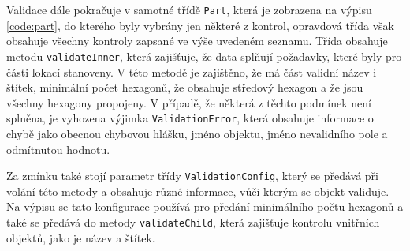Validace dále pokračuje v samotné třídě \texttt{Part}, která je zobrazena na výpisu \ref{code:part}, do kterého byly vybrány jen některé z kontrol, opravdová třída však obsahuje všechny kontroly zapsané ve výše uvedeném seznamu. Třída obsahuje metodu \texttt{validateInner}, která zajišťuje, že data splňují požadavky, které byly pro části lokací stanoveny. V této metodě je zajištěno, že má část validní název i štítek, minimální počet hexagonů, že obsahuje středový hexagon a že jsou všechny hexagony propojeny. V případě, že některá z těchto podmínek není splněna, je vyhozena výjimka \texttt{ValidationError}, která obsahuje informace o chybě jako obecnou chybovou hlášku, jméno objektu, jméno nevalidního pole a odmítnutou hodnotu.

Za zmínku také stojí parametr třídy  \texttt{ValidationConfig}, který se předává při volání této metody a obsahuje různé informace, vůči kterým se objekt validuje. Na výpisu se tato konfigurace používá pro předání minimálního počtu hexagonů a také se předává do metody \texttt{validateChild}, která zajišťuje kontrolu vnitřních objektů, jako je název a štítek.

